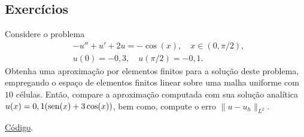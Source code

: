 \emconstrucao

\subsection*{Exercícios}

\begin{exer}\label{exer:dcr}
  Considere o problema
  \begin{align}
    &-u'' + u' + 2u = -\cos(x),\quad x\in (0, \pi/2),\\
    &u(0)=-0,3,\quad u(\pi/2)=-0,1.
  \end{align}
  Obtenha uma aproximação por elementos finitos para a solução deste problema, empregando o espaço de elementos finitos linear sobre uma malha uniforme com $10$ células. Então, compare a aproximação computada com sua solução analítica $u(x) = 0,1(\operatorname{sen}(x)+3\cos(x))$, bem como, compute o erro $\|u-u_h\|_{L^2}$.
\end{exer}
\begin{resp}
  \ifispython
  \href{https://github.com/phkonzen/notas/blob/master/src/MetodoElementosFinitos/cap_mef1d/dados/exer_dcr/exer_dcr.py}{Código}.
  \fi
\end{resp}

\emconstrucao